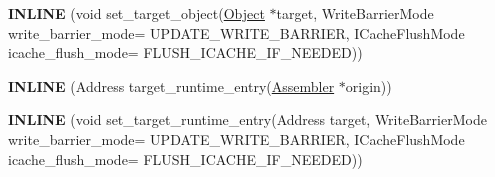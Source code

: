\begin{DoxyCompactItemize}
\item 
{\bfseries I\+N\+L\+I\+NE} (void set\+\_\+target\+\_\+object(\hyperlink{classv8_1_1internal_1_1_object}{Object} $\ast$target,                                                                                                                       Write\+Barrier\+Mode write\+\_\+barrier\+\_\+mode=                                                                                                                                       U\+P\+D\+A\+T\+E\+\_\+\+W\+R\+I\+T\+E\+\_\+\+B\+A\+R\+R\+I\+ER,                                                                                                                       I\+Cache\+Flush\+Mode icache\+\_\+flush\+\_\+mode=                                                                                                                                       F\+L\+U\+S\+H\+\_\+\+I\+C\+A\+C\+H\+E\+\_\+\+I\+F\+\_\+\+N\+E\+E\+D\+ED))\hypertarget{classv8_1_1internal_1_1_reloc_info_af3330448f3e4c5fb759b2b3b31513972}{}\label{classv8_1_1internal_1_1_reloc_info_af3330448f3e4c5fb759b2b3b31513972}

\item 
{\bfseries I\+N\+L\+I\+NE} (Address target\+\_\+runtime\+\_\+entry(\hyperlink{classv8_1_1internal_1_1_assembler}{Assembler} $\ast$origin))\hypertarget{classv8_1_1internal_1_1_reloc_info_aa18787c0c4aa5185802b95fa932641dd}{}\label{classv8_1_1internal_1_1_reloc_info_aa18787c0c4aa5185802b95fa932641dd}

\item 
{\bfseries I\+N\+L\+I\+NE} (void set\+\_\+target\+\_\+runtime\+\_\+entry(Address target,                                                                                                                                                   Write\+Barrier\+Mode write\+\_\+barrier\+\_\+mode=                                                                                                                                                                   U\+P\+D\+A\+T\+E\+\_\+\+W\+R\+I\+T\+E\+\_\+\+B\+A\+R\+R\+I\+ER,                                                                                                                                                   I\+Cache\+Flush\+Mode icache\+\_\+flush\+\_\+mode=                                                                                                                                                                   F\+L\+U\+S\+H\+\_\+\+I\+C\+A\+C\+H\+E\+\_\+\+I\+F\+\_\+\+N\+E\+E\+D\+ED))\hypertarget{classv8_1_1internal_1_1_reloc_info_a3cff7c64127c597e97c381fd17afcaba}{}\label{classv8_1_1internal_1_1_reloc_info_a3cff7c64127c597e97c381fd17afcaba}


\end{DoxyCompactItemize}
